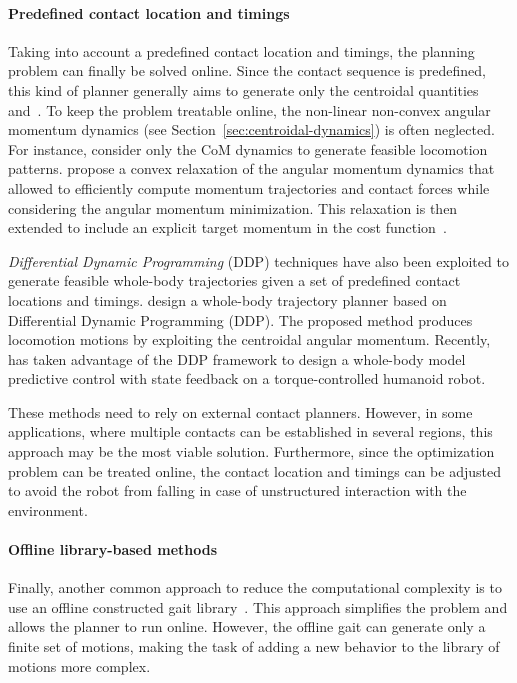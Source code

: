 \paragraph{Predefined contact location and timings}
Taking into account a predefined contact location and timings, the planning problem can finally be solved
online. Since the contact sequence is predefined, this kind of planner generally aims to generate only the
centroidal quantities~\citep{Orin2013} and~\citep[Section~3.9.3]{Traversaro2017ModellingDynamics}. To keep the problem treatable online, the non-linear non-convex angular momentum dynamics (see Section~\ref{sec:centroidal-dynamics}) is often neglected. For instance, \cite{Caron2016Multi-contactAccelerations} consider only the CoM dynamics to generate feasible locomotion patterns. \cite{Ponton2016AGeneration} propose a convex relaxation of the angular momentum dynamics that allowed to efficiently compute momentum trajectories and contact forces while considering the angular momentum minimization. This relaxation is then extended to include an explicit target momentum in the cost function~\citep{Ponton2018}.
\par
\emph{Differential Dynamic Programming} (DDP) techniques have also been exploited to generate feasible whole-body trajectories given a set of predefined contact locations and timings. \cite{Budhiraja2018DifferentialDynamics} design a whole-body trajectory planner based on Differential Dynamic Programming (DDP). The proposed method produces locomotion motions by exploiting the centroidal angular momentum. Recently, \citep{Dantec2021WholeTalos} has taken advantage of the DDP framework to design a whole-body model predictive control with state feedback on a torque-controlled humanoid robot.
\par
These methods need to rely on external contact planners. However, in some
applications, where multiple contacts can be established in several regions,
this approach may be the most viable solution.
Furthermore, since the optimization problem can be
treated online, the contact location and timings can be adjusted to avoid the robot from falling in
case of unstructured interaction with the environment.

\paragraph{Offline library-based methods}
Finally, another common approach to reduce the computational complexity is to use an offline constructed gait library~\citep{Nguyen2020DynamicFunctions,Guo2021}. This approach simplifies the problem and allows the planner to run online. However, the offline gait can generate only a finite set of motions, making the task of adding a new behavior to the library of motions more complex.



